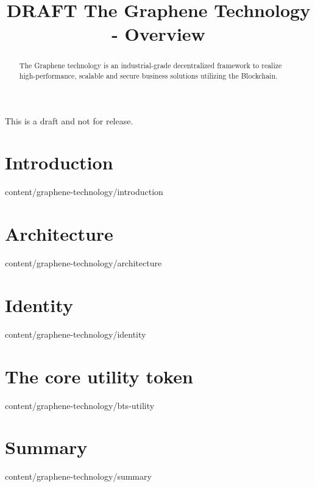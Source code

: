 \documentclass{btswhitepaper}
\title{DRAFT The Graphene Technology - Overview}
\begin{document}
\maketitle

This is a draft and not for release.\\

\begin{abstract}%
 The Graphene technology is an industrial-grade decentralized framework to realize 
high-performance, scalable and secure business solutions utilizing the Blockchain.
\end{abstract}

\section { Introduction            }  { content/graphene-technology/introduction } 

\section { Architecture            }  { content/graphene-technology/architecture } 

\section { Identity                }  { content/graphene-technology/identity     } 

\section { The core utility token }  { content/graphene-technology/bts-utility  } 

\section { Summary }  { content/graphene-technology/summary  } 



\end{document}
